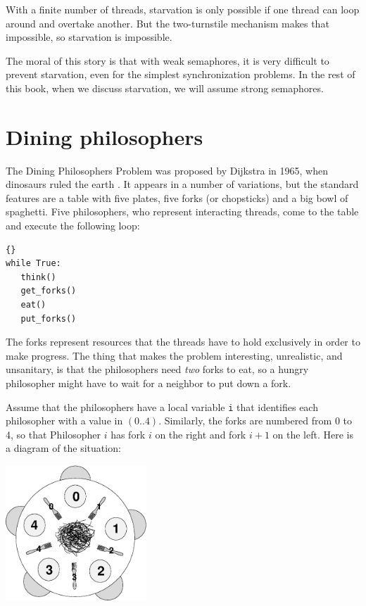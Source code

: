 \documentclass{book}
\newcommand{\clearemptydoublepage}{\newpage\cleardoublepage}
\begin{document}
With a finite number of threads, starvation is only possible if one
thread can loop around and overtake another.  But the two-turnstile
mechanism makes that impossible, so starvation is impossible.

The moral of this story is that with weak semaphores, it is very
difficult to prevent starvation, even for the simplest synchronization
problems.  In the rest of this book, when we discuss starvation, we
will assume strong semaphores.



\clearemptydoublepage
\section{Dining philosophers}
\label{dining}

The Dining Philosophers Problem was proposed by Dijkstra in
1965, when dinosaurs ruled the earth \cite{dijkstra65}.  It
appears in a number of variations, but the standard features
are a table with five plates, five forks (or chopsticks) and
a big bowl of spaghetti.  Five philosophers, who represent
interacting threads, come to the table and execute the
following loop:

\begin{lstlisting}[caption={Basic philosopher loop}]{}
while True:
   think()
   get_forks()
   eat()
   put_forks()
\end{lstlisting}

The forks represent resources that the threads have to hold
exclusively in order to make progress.  The thing that makes the
problem interesting, unrealistic, and unsanitary, is that the
philosophers need {\em two} forks to eat, so a hungry philosopher
might have to wait for a neighbor to put down a fork.

Assume that the philosophers have a local variable {\tt i} that
identifies each philosopher with a value in $(0..4)$.  Similarly,
the forks are numbered from 0 to 4, so that Philosopher $i$ has
fork $i$ on the right and fork $i+1$ on
the left.  Here is a diagram of the situation:

\centerline{\includegraphics[height=2in]{table.eps}}
\end{document}
